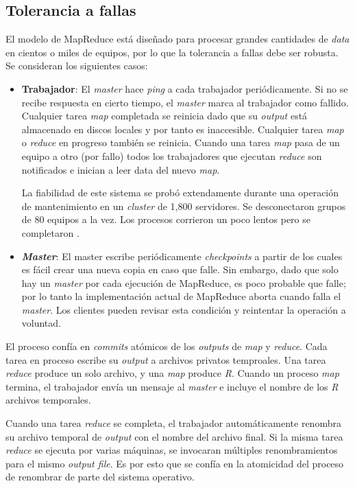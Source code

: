 \documentclass[spanish]{article}
\begin{document}
\subsection{Tolerancia a fallas}
	El modelo de MapReduce está diseñado para procesar grandes cantidades de \textit{data} en cientos o miles de equipos, por lo que la tolerancia a fallas debe ser robusta. Se consideran los siguientes casos:
    \begin{itemize}
    	\item \textbf{Trabajador}: El \textit{master} hace \textit{ping} a cada trabajador periódicamente. Si no se recibe respuesta en cierto tiempo, el \textit{master} marca al trabajador como fallido. Cualquier tarea \textit{map} completada se reinicia dado que su \textit{output} está almacenado en discos locales y por tanto es inaccesible. Cualquier tarea \textit{map} o \textit{reduce} en progreso también se reinicia. Cuando una tarea \textit{map} pasa de un equipo a otro (por fallo) todos los trabajadores que ejecutan \textit{reduce} son notificados e inician a leer data del nuevo \textit{map}. 
    	
    	La fiabilidad de este sistema se probó extendamente durante una operación de mantenimiento en un \textit{cluster} de 1,800 servidores. Se desconectaron grupos de 80 equipos a la vez. Los procesos corrieron un poco lentos pero se completaron \cite{MapReduceNews}.
    	\item \textbf{\textit{Master}}: El master escribe periódicamente \textit{checkpoints} a partir de los cuales es fácil crear una nueva copia en caso que falle. Sin embargo, dado que solo hay un \textit{master} por cada ejecución de MapReduce, es poco probable que falle; por lo tanto la implementación actual de MapReduce aborta cuando falla el \textit{master}. Los clientes pueden revisar esta condición y reintentar la operación a voluntad.
\end{itemize}
El proceso confía en \textit{commits} atómicos de los \textit{outputs} de \textit{map} y \textit{reduce}. Cada tarea en proceso escribe su \textit{output} a archivos privatos temproales. Una tarea \textit{reduce} produce un solo archivo, y una \textit{map} produce \textit{R}. Cuando un proceso \textit{map} termina, el trabajador envía un mensaje al \textit{master} e incluye el nombre de los \textit{R} archivos temporales.

Cuando una tarea \textit{reduce} se completa, el trabajador automáticamente renombra su archivo temporal de \textit{output} con el nombre del archivo final. Si la misma tarea \textit{reduce} se ejecuta por varias máquinas, se invocaran múltiples renombramientos para el mismo \textit{output file}. Es por esto que se confía en la atomicidad del proceso de renombrar de parte del sistema operativo. 
\end{document}
